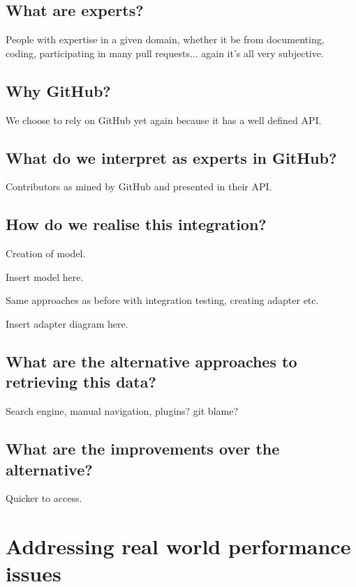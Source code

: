 
\subsection{What are experts?}

People with expertise in a given domain, whether it be from documenting, coding, participating in many pull requests... again it's all very subjective.

\subsection{Why GitHub?}

We choose to rely on GitHub yet again because it has a well defined API.

\subsection{What do we interpret as experts in GitHub?}

Contributors as mined by GitHub and presented in their API.

\subsection{How do we realise this integration?}

Creation of model.

Insert model here.

Same approaches as before with integration testing, creating adapter etc.

Insert adapter diagram here.

\subsection{What are the alternative approaches to retrieving this data?}

Search engine, manual navigation, plugins? git blame?

\subsection{What are the improvements over the alternative?}

Quicker to access.

\section{Addressing real world performance issues}

